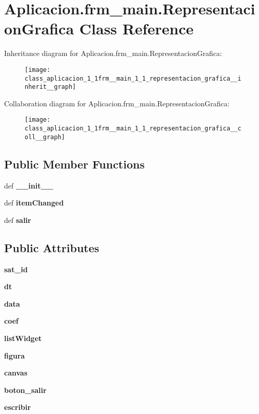 \section{\-Aplicacion.\-frm\-\_\-main.\-Representacion\-Grafica \-Class \-Reference}
\label{class_aplicacion_1_1frm__main_1_1_representacion_grafica}


\-Inheritance diagram for \-Aplicacion.\-frm\-\_\-main.\-Representacion\-Grafica\-:\nopagebreak
\begin{figure}[H]
\begin{center}
\leavevmode
\texttt{[image: class\_aplicacion\_1\_1frm\_\_main\_1\_1\_representacion\_grafica\_\_inherit\_\_graph]}
\end{center}
\end{figure}


\-Collaboration diagram for \-Aplicacion.\-frm\-\_\-main.\-Representacion\-Grafica\-:\nopagebreak
\begin{figure}[H]
\begin{center}
\leavevmode
\texttt{[image: class\_aplicacion\_1\_1frm\_\_main\_1\_1\_representacion\_grafica\_\_coll\_\_graph]}
\end{center}
\end{figure}
\subsection*{\-Public \-Member \-Functions}
\begin{DoxyCompactItemize}
\item 
def {\bf \-\_\-\-\_\-init\-\_\-\-\_\-}
\item 
def {\bf item\-Changed}
\item 
def {\bf salir}
\end{DoxyCompactItemize}
\subsection*{\-Public \-Attributes}
\begin{DoxyCompactItemize}
\item 
{\bf sat\-\_\-id}
\item 
{\bf dt}
\item 
{\bf data}
\item 
{\bf coef}
\item 
{\bf list\-Widget}
\item 
{\bf figura}
\item 
{\bf canvas}
\item 
{\bf boton\-\_\-salir}
\item 
{\bf escribir}
\end{DoxyCompactItemize}


